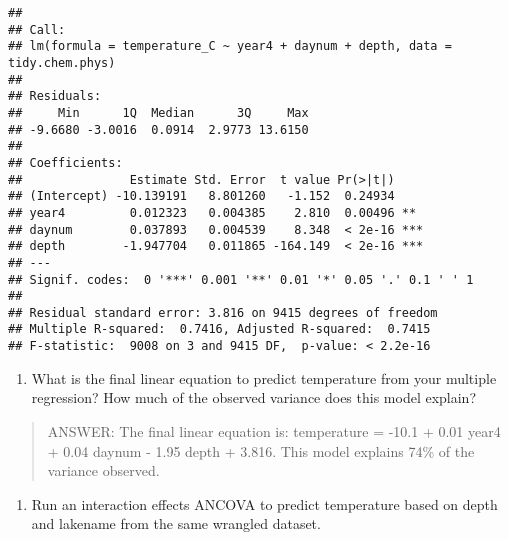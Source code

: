 \documentclass[]{article}
\newenvironment{Shaded}{\begin{snugshade}}{\end{snugshade}}
\newcommand{\KeywordTok}[1]{\textcolor[rgb]{0.13,0.29,0.53}{\textbf{#1}}}
\newcommand{\DataTypeTok}[1]{\textcolor[rgb]{0.13,0.29,0.53}{#1}}
\newcommand{\StringTok}[1]{\textcolor[rgb]{0.31,0.60,0.02}{#1}}
\newcommand{\CommentTok}[1]{\textcolor[rgb]{0.56,0.35,0.01}{\textit{#1}}}
\newcommand{\OperatorTok}[1]{\textcolor[rgb]{0.81,0.36,0.00}{\textbf{#1}}}
\newcommand{\NormalTok}[1]{#1}
\providecommand{\tightlist}{%
  \setlength{\itemsep}{0pt}\setlength{\parskip}{0pt}}
\begin{document}
\begin{verbatim}
## 
## Call:
## lm(formula = temperature_C ~ year4 + daynum + depth, data = tidy.chem.phys)
## 
## Residuals:
##     Min      1Q  Median      3Q     Max 
## -9.6680 -3.0016  0.0914  2.9773 13.6150 
## 
## Coefficients:
##               Estimate Std. Error  t value Pr(>|t|)    
## (Intercept) -10.139191   8.801260   -1.152  0.24934    
## year4         0.012323   0.004385    2.810  0.00496 ** 
## daynum        0.037893   0.004539    8.348  < 2e-16 ***
## depth        -1.947704   0.011865 -164.149  < 2e-16 ***
## ---
## Signif. codes:  0 '***' 0.001 '**' 0.01 '*' 0.05 '.' 0.1 ' ' 1
## 
## Residual standard error: 3.816 on 9415 degrees of freedom
## Multiple R-squared:  0.7416, Adjusted R-squared:  0.7415 
## F-statistic:  9008 on 3 and 9415 DF,  p-value: < 2.2e-16
\end{verbatim}

\begin{enumerate}
\def\labelenumi{\arabic{enumi}.}
\setcounter{enumi}{12}
\tightlist
\item
  What is the final linear equation to predict temperature from your
  multiple regression? How much of the observed variance does this model
  explain?
\end{enumerate}

\begin{quote}
ANSWER: The final linear equation is: temperature = -10.1 + 0.01 year4 +
0.04 daynum - 1.95 depth + 3.816. This model explains 74\% of the
variance observed.
\end{quote}

\begin{enumerate}
\def\labelenumi{\arabic{enumi}.}
\setcounter{enumi}{13}
\tightlist
\item
  Run an interaction effects ANCOVA to predict temperature based on
  depth and lakename from the same wrangled dataset.
\end{enumerate}

\begin{Shaded}
\end{Shaded}
\end{document}
